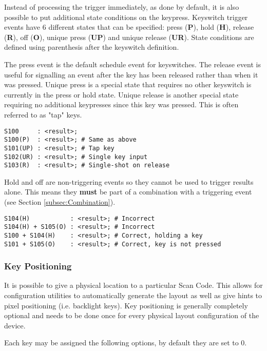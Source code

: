 \documentclass{kiibohd-template}
\begin{document}
Instead of processing the trigger immediately, as done by default, it is also possible to put additional state conditions on the keypress.
Keyswitch trigger events have 6 different states that can be specified: press (\textbf{P}), hold (\textbf{H}), release (\textbf{R}), off (\textbf{O}), unique press (\textbf{UP}) and unique release (\textbf{UR}).
State conditions are defined using parenthesis after the keyswitch definition.

The press event is the default schedule event for keyswitches.
The release event is useful for signalling an event after the key has been released rather than when it was pressed.
Unique press is a special state that requires no other keyswitch is currently in the press or hold state.
Unique release is another special state requiring no additional keypresses since this key was pressed.
This is often referred to as "tap" keys.

\begin{lstlisting}
S100     : <result>;
S100(P)  : <result>; # Same as above
S101(UP) : <result>; # Tap key
S102(UR) : <result>; # Single key input
S103(R)  : <result>; # Single-shot on release
\end{lstlisting}

Hold and off are non-triggering events so they cannot be used to trigger results alone.
This means they \textbf{must} be part of a combination with a triggering event (see Section \ref{subsec:Combination}).

\begin{lstlisting}
S104(H)           : <result>; # Incorrect
S104(H) + S105(O) : <result>; # Incorrect
S100 + S104(H)    : <result>; # Correct, holding a key
S101 + S105(O)    : <result>; # Correct, key is not pressed
\end{lstlisting}


\subsubsection{Key Positioning}
\label{subsubsec:keypositioning}

It is possible to give a physical location to a particular Scan Code.
This allows for configuration utilities to automatically generate the layout as well as give hints to pixel positioning (i.e. backlight keys).
Key positioning is generally completely optional and needs to be done once for every physical layout configuration of the device.

Each key may be assigned the following options, by default they are set to 0.
\end{document}
